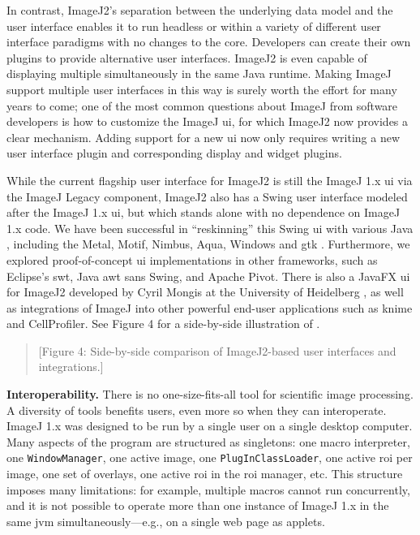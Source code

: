 \documentclass{bmcart}
\begin{document}
In contrast, ImageJ2's separation between the underlying data model and the
user interface enables it to run headless or within a variety of different user
interface paradigms with no changes to the core. Developers can create their
own plugins to provide alternative user interfaces. ImageJ2 is even capable of
displaying multiple  simultaneously in the same Java runtime.
Making ImageJ support multiple user interfaces in this way is surely worth the
effort for many years to come; one of the most common questions about ImageJ
from software developers is how to customize the ImageJ \acrshort{ui}, for
which ImageJ2 now provides a clear mechanism. Adding support for a new
\acrshort{ui} now only requires writing a new user interface plugin and
corresponding display and widget plugins.

While the current flagship user interface for ImageJ2 is still the ImageJ 1.x
\acrshort{ui} via the ImageJ Legacy component, ImageJ2 also has a Swing user
interface modeled after the ImageJ 1.x \acrshort{ui}, but which stands alone
with no dependence on ImageJ 1.x code. We have been successful in
``reskinning'' this Swing \acrshort{ui} with various Java ,
including the Metal, Motif, Nimbus, Aqua, Windows and \acrfull{gtk}
. Furthermore, we explored proof-of-concept \acrshort{ui}
implementations in other frameworks, such as Eclipse's \acrfull{swt}, Java
\acrfull{awt} sans Swing, and Apache Pivot. There is also a JavaFX
\acrshort{ui} for ImageJ2 developed by Cyril Mongis at the University of
Heidelberg \cite{imagejfx}, as well as integrations of ImageJ into other
powerful end-user applications such as \acrshort{knime} and CellProfiler. See
Figure 4 for a side-by-side illustration of .

\begin{quote}
[Figure 4: Side-by-side comparison of ImageJ2-based user interfaces and
integrations.]
\end{quote}

\textbf{Interoperability.} There is no one-size-fits-all tool for scientific
image processing. A diversity of tools benefits users, even more so when they
can interoperate. ImageJ 1.x was designed to be run by a single user on a
single desktop computer. Many aspects of the program are structured as
singletons: one macro interpreter, one \texttt{WindowManager}, one active
image, one \texttt{PlugInClassLoader}, one active \acrshort{roi} per image, one
set of overlays, one active \acrshort{roi} in the \acrshort{roi} manager, etc.
This structure imposes many limitations: for example, multiple macros cannot
run concurrently, and it is not possible to operate more than one instance of
ImageJ 1.x in the same \acrshort{jvm} simultaneously---e.g., on a single web
page as applets.
\end{document}
